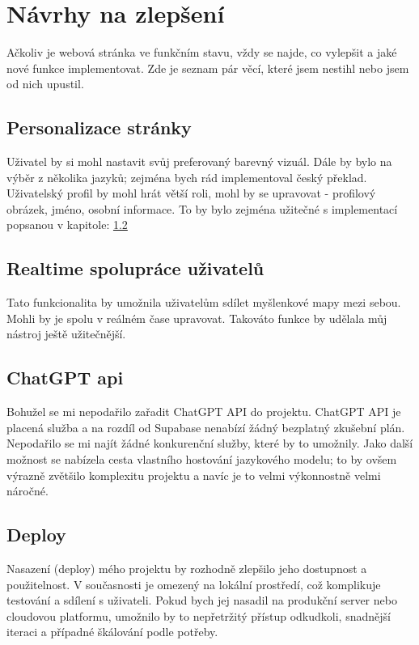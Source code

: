 \section{Návrhy na zlepšení}
Ačkoliv je webová stránka ve funkčním stavu, vždy se najde, co vylepšit a jaké nové funkce implementovat. Zde je seznam pár věcí, které jsem nestihl nebo jsem od nich upustil.
\subsection{Personalizace stránky}
Uživatel by si mohl nastavit svůj preferovaný barevný vizuál. Dále by bylo na výběr z několika jazyků; zejména bych rád implementoval český překlad. Uživatelský profil by mohl hrát větší roli, mohl by se upravovat - profilový obrázek, jméno, osobní informace. To by bylo zejména užitečné s implementací popsanou v kapitole: \ref{Realitme}
\subsection{Realtime spolupráce uživatelů}
\label{Realitme}
Tato funkcionalita by umožnila uživatelům sdílet myšlenkové mapy mezi sebou. Mohli by je spolu v reálném čase upravovat. Takováto funkce by udělala můj nástroj ještě užitečnější.
\subsection{ChatGPT api}
Bohužel se mi nepodařilo zařadit ChatGPT API do projektu. ChatGPT API je placená služba a na rozdíl od Supabase nenabízí žádný bezplatný zkušební plán. Nepodařilo se mi najít žádné konkurenční služby, které by to umožnily. Jako další možnost se nabízela cesta vlastního hostování jazykového modelu; to by ovšem výrazně zvětšilo komplexitu projektu a navíc je to velmi výkonnostně velmi náročné.
\subsection{Deploy}
Nasazení (deploy) mého projektu by rozhodně zlepšilo jeho dostupnost a použitelnost. V současnosti je omezený na lokální prostředí, což komplikuje testování a sdílení s uživateli. Pokud bych jej nasadil na produkční server nebo cloudovou platformu, umožnilo by to nepřetržitý přístup odkudkoli, snadnější iteraci a případné škálování podle potřeby. 